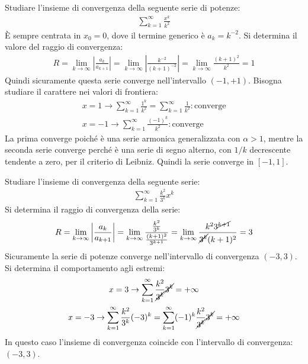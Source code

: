 \documentclass{article}
\numberwithin{equation}{subsection}
\begin{document}
Studiare l'insieme di convergenza della seguente serie di potenze:
\begin{gather*}
    \displaystyle\sum_{k=1}^\infty\frac{x^k}{k^2}
\end{gather*}
È sempre centrata in $x_0=0$, dove il termine generico è $a_k=k^{-2}$. 
Si determina il valore del raggio di convergenza:
\begin{gather*}
    R=\lim_{k\to\infty}\left|\frac{a_k}{{a_{k+1}}}\right|=
    \lim_{k\to\infty}\left|\frac{k^{-2}}{{(k+1)^{-2}}}\right|=
    \lim_{k\to\infty}\frac{(k+1)^2}{k^2}=1
\end{gather*}
Quindi sicuramente questa serie converge nell'intervallo $(-1,+1)$. Bisogna studiare il carattere nei valori di frontiera:
\begin{gather*}
    x=1\rightarrow\displaystyle\sum_{k=1}^\infty\frac{1^k}{k^2}=\sum_{k=1}^\infty\frac{1}{k^2}:\text{converge}\\
    x=-1\rightarrow\displaystyle\sum_{k=1}^\infty\frac{(-1)^k}{k^2}:\text{converge}
\end{gather*}
La prima converge poiché è una serie armonica generalizzata con $\alpha>1$, mentre la seconda serie converge perché è una serie di segno alterno, con $1/k$ decrescente tendente a zero, per il criterio di Leibniz. Quindi la serie converge in $[-1,1]$. 




Studiare l'insieme di convergenza della seguente serie:
\begin{gather*}
    \displaystyle\sum_{k=1}^\infty\frac{k^2}{3^k}x^k
\end{gather*}
Si determina il raggio di convergenza della serie:
\begin{gather*}
    R=\lim_{k\to\infty}\left|\frac{a_k}{{a_{k+1}}}\right|=
    \lim_{k\to\infty}\frac{\frac{k^2}{3^k}}{\frac{(k+1)^2}{3^{k+1}}}=
    \lim_{k\to\infty}\frac{k^23^{\cancel{k+1}}}{\cancel{3^k}(k+1)^2}=3
\end{gather*}
Sicuramente la serie di potenze converge nell'intervallo di convergenza $(-3, 3)$. Si determina il comportamento agli estremi:
\begin{gather*}
    x=3\rightarrow\displaystyle\sum_{k=1}^\infty\frac{k^2}{\cancel{3^k}}\cancel{3^k}=+\infty\\
    x=-3\rightarrow\displaystyle\sum_{k=1}^\infty\frac{k^2}{3^k}(-3)^k=
    \sum_{k=1}^\infty(-1)^k\frac{k^2}{\cancel{3^k}}\cancel{3^k}=+\infty
\end{gather*}
In questo caso l'insieme di convergenza coincide con l'intervallo di convergenza: $(-3, 3)$. 
\end{document}
